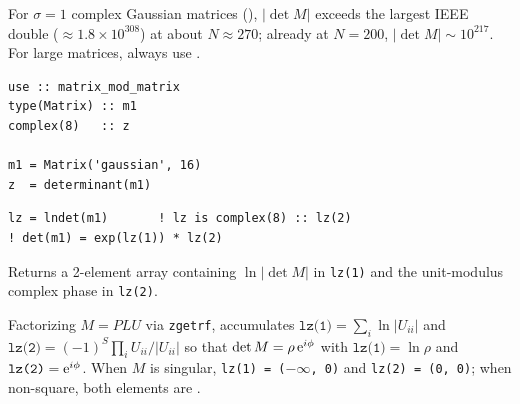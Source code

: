 \begin{warnbox}
For $\sigma = 1$ complex Gaussian matrices (), $|\det M|$ exceeds the largest IEEE double ($\approx 1.8\times 10^{308}$) at about $N \approx 270$; already at $N = 200$, $|\det M| \sim 10^{217}$. For large matrices, always use .
\end{warnbox}

\begin{description}[leftmargin=2.2cm, style=nextline]
\end{description}

\lstset{language=[95]Fortran}
\begin{lstlisting}
use :: matrix_mod_matrix
type(Matrix) :: m1
complex(8)   :: z

m1 = Matrix('gaussian', 16)
z  = determinant(m1)
\end{lstlisting}


\lstset{language=[95]Fortran}
\begin{lstlisting}
lz = lndet(m1)       ! lz is complex(8) :: lz(2)
! det(m1) = exp(lz(1)) * lz(2)
\end{lstlisting}

Returns a 2-element  array containing $\ln|\det M|$ in \texttt{lz(1)} and the unit-modulus complex phase in \texttt{lz(2)}.

Factorizing $M = P L U$ via \texttt{zgetrf},  accumulates $\texttt{lz(1)} = \sum_i \ln|U_{ii}|$ and $\texttt{lz(2)} = (-1)^S \prod_i U_{ii}/|U_{ii}|$ so that $\det M = \rho\, {\rm e}^{i\phi}$ with $\texttt{lz(1)} = \ln\rho$ and $\texttt{lz(2)} = {\rm e}^{i\phi}$. When $M$ is singular, \texttt{lz(1) = (}$-\infty$\texttt{, 0)} and \texttt{lz(2) = (0, 0)}; when non-square, both elements are .

\begin{description}[leftmargin=2.2cm, style=nextline]
\end{description}

